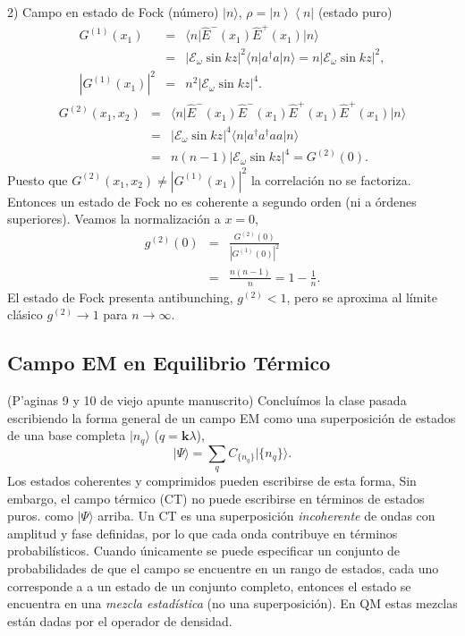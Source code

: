 \documentclass[twocolumn,aps,eqsecnum]{revtex4}
\newcommand{\mbk}{\mathbf{k}}
\newcommand{\mcE}{\mathcal{E}}
\newcommand{\adg}{a^{\dag}}
\providecommand{\bra}[1]{\langle #1 \rvert}
\providecommand{\ket}[1]{\lvert #1 \rangle}
\newcommand{\ketbra}[2]{\left| {#1} \right\rangle\left\langle {#2}\right|}
\begin{document}
2) Campo en estado de Fock (n\'umero) $\ket{n}$, $\rho =\ketbra{n}{n}$ 
(estado puro)
%
\begin{eqnarray*}
G^{(1)}(x_1) &=& \bra{n} \hat{E}^- (x_1) \hat{E}^+ (x_1) \ket{n}   \\ 
&=& |\mcE_{\omega} \sin{kz}|^2 \bra{n} \adg a \ket{n} 
    = n |\mcE_{\omega} \sin{kz}|^2 ,     \\ 
|G^{(1)}(x_1)|^2 &=& n^2 |\mcE_{\omega} \sin{kz}|^4 . 
\end{eqnarray*}
%
\begin{eqnarray*}
G^{(2)}(x_1,x_2) 
&=& \bra{n} \hat{E}^- (x_1) \hat{E}^- (x_1) \hat{E}^+ (x_1) 
    \hat{E}^+ (x_1) \ket{n}   \\ 
&=& |\mcE_{\omega} \sin{kz}|^4 \bra{n} \adg \adg a a \ket{n} \\  
&=& n(n-1) |\mcE_{\omega} \sin{kz}|^4 = G^{(2)} (0) .
   \end{eqnarray*}
Puesto que $G^{(2)}(x_1,x_2) \neq |G^{(1)}(x_1)|^2$ la correlaci\'on no 
se factoriza. Entonces un estado de Fock no es coherente a segundo orden 
(ni a \'ordenes superiores). Veamos la normalizaci\'on a $x=0$, 
%
\begin{eqnarray*}
g^{(2)}(0) &=& \frac{ G^{(2)} (0) }{ |G^{(1)} (0)|^2 } \\ 
  &=& \frac{n(n-1)}{n} = 1 - \frac{1}{n} . 
\end{eqnarray*}
El estado de Fock presenta antibunching, $g^{(2)} < 1$, pero se aproxima 
al l\'imite cl\'asico $g^{(2)} \to 1$ para $n \to \infty$. 

\subsection{Campo EM en Equilibrio T\'ermico} %
(P'aginas 9 y 10 de viejo apunte manuscrito)
\newline Conclu\'imos la clase pasada escribiendo la forma general de 
un campo EM como una superposici\'on de estados de una base completa 
$\ket{n_q}$ ($q= \mbk \lambda$), 
$$ \ket{\Psi} = \sum_q C_{\{n_q\}} \ket{\{n_q\}} .$$ 
Los estados coherentes y comprimidos pueden escribirse de esta forma,  
Sin embargo, el campo t\'ermico (CT) no puede escribirse en t\'erminos 
de estados puros. como $\ket{\Psi}$ arriba. Un CT es una superposici\'on 
\textit{incoherente} de ondas con amplitud y fase definidas, por lo que cada 
onda contribuye en t\'erminos probabil\'isticos. Cuando \'unicamente 
se puede especificar un conjunto de probabilidades de que el campo se 
encuentre en un rango de estados, cada uno corresponde a a un estado de 
un conjunto completo, entonces el estado se encuentra en una 
\textit{mezcla estad\'istica} (no una superposici\'on). En QM estas 
mezclas est\'an dadas por el operador de densidad. 
\end{document}

